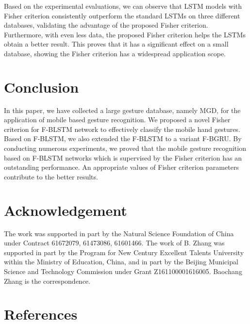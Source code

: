 \documentclass[review]{elsarticle}
\begin{document}
Based on the experimental evaluations, we can observe that LSTM models with Fisher criterion consistently outperform the standard LSTMs on three different databases, validating the advantage of the proposed Fisher criterion. %
Furthermore, with even less data, the proposed Fisher criterion helps the LSTMs obtain a better result. This proves that it has a significant effect on a small database, showing the Fisher criterion has a widespread application scope.

\section{Conclusion}\label{sec:conclusion}{In this paper, we have collected a large gesture database, namely MGD, for the application of mobile based gesture recognition. We proposed a novel Fisher criterion for F-BLSTM network to effectively classify the mobile hand gestures. Based on F-BLSTM, we also extended the F-BLSTM to a variant F-BGRU. By conducting numerous experiments, we proved that the mobile gesture recognition based on F-BLSTM networks which is supervised by the Fisher criterion has an outstanding performance. An appropriate values of Fisher criterion parameters contribute to the better results.}
\section*{Acknowledgement}
The work was supported in part by the Natural Science Foundation of China under Contract 61672079, 61473086, 61601466. The work of B. Zhang was supported in part by the Program for New Century Excellent Talents University within the Ministry of Education, China, and in part by the Beijing Municipal Science and Technology Commission under Grant Z161100001616005. Baochang Zhang is the correspondence.
\section*{References}

\end{document}
